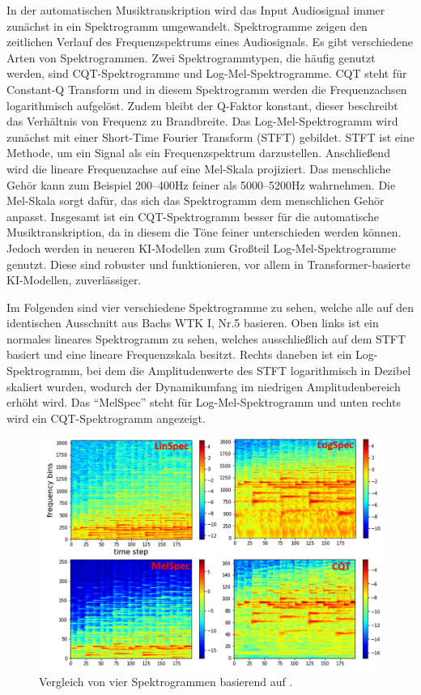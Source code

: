 \begin{description}[style=nextline]
\item[Spektrogramme]\label{itm:spektrogramm}
In der automatischen Musiktranskription wird das Input Audiosignal immer zunächst in ein Spektrogramm umgewandelt.
Spektrogramme zeigen den zeitlichen Verlauf des Frequenzspektrums eines Audiosignals.
Es gibt verschiedene Arten von Spektrogrammen.
Zwei Spektrogrammtypen, die häufig genutzt werden, sind CQT-Spektrogramme und Log-Mel-Spektrogramme.
CQT steht für Constant-Q Transform und in diesem Spektrogramm werden die Frequenzachsen logarithmisch aufgelöst.
Zudem bleibt der Q-Faktor konstant, dieser beschreibt das Verhältnis von Frequenz zu Brandbreite.
Das Log-Mel-Spektrogramm wird zunächst mit einer Short-Time Fourier Transform (STFT) gebildet.
STFT ist eine Methode, um ein Signal als ein Frequenzspektrum darzustellen.
Anschließend wird die lineare Frequenzachse auf eine Mel-Skala projiziert.
Das menschliche Gehör kann zum Beispiel 200--400Hz feiner als 5000--5200Hz wahrnehmen.
Die Mel-Skala sorgt dafür, das sich das Spektrogramm dem menschlichen Gehör anpasst.
Insgesamt ist ein CQT-Spektrogramm besser für die automatische Musiktranskription,
da in diesem die Töne feiner unterschieden werden können.
Jedoch werden in neueren KI-Modellen zum Großteil Log-Mel-Spektrogramme genutzt.
Diese sind robuster und funktionieren, vor allem in Transformer-basierte KI-Modellen, zuverlässiger.

Im Folgenden sind vier verschiedene Spektrogramme zu sehen,
welche alle auf den identischen Ausschnitt aus Bachs WTK I, Nr.5\cite{bach_wtk1_nr5} basieren.
Oben links ist ein normales lineares Spektrogramm zu sehen,
welches ausschließlich auf dem STFT basiert und eine lineare Frequenzskala besitzt.
Rechts daneben ist ein Log-Spektrogramm,
bei dem die Amplitudenwerte des STFT logarithmisch in Dezibel skaliert wurden,
wodurch der Dynamikumfang im niedrigen Amplitudenbereich erhöht wird.
Das \enquote{MelSpec} steht für Log-Mel-Spektrogramm und unten rechts wird ein CQT-Spektrogramm angezeigt.
\begin{figure}[H]
    \centering
    \includegraphics[width=1\textwidth]{Graphics/different_spectrograms}
    \caption[Vergleich 4 Spektrogramme]{Vergleich von vier Spektrogrammen basierend auf \cite{cheuk2020impact}.}
    \label{fig:different_specs}
\end{figure}
\end{description}

